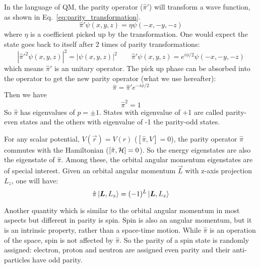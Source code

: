 In the language of QM, the parity operator ($\hat{\pi}'$) will transform 
a wave function, as shown in Eq.~\ref{eq:parity_transformation}.
\begin{equation}
    \hat{\pi}'\psi(x, y, z) = \eta \psi(-x, -y, -z)
    \label{eq:parity_transformation}
\end{equation}
where $\eta$ is a coefficient picked up by the transformation. One would expect
the state goes back to itself after 2 times of parity transformations:
\begin{equation}
    |\hat{\pi}'^2 \psi(x, y, z)|^2 = |\psi(x, y, z)|^2
    \qquad
    \hat{\pi}'\psi(x, y, z) = e^{i\phi/2}\psi(-x, -y, -z)
\end{equation}
which means $\hat{\pi}'$ is an unitary operator. The pick up phase can
be absorbed into the operator to get the new parity operator (what we use hereafter): 
\begin{equation}
    \hat{\pi} = \hat{\pi}'e^{-i\phi/2}
\end{equation}
Then we have
\begin{equation}
    \hat{\pi}^2 = 1 
\end{equation}
So $\hat{\pi}$ has eigenvalues of $p = \pm 1$. States with eigenvalue of +1 are called
parity-even states and the others with eigenvalue of -1 the parity-odd states.

For any scalar potential, $V(\vec{r}) = V(r)$ ($[\hat{\pi}, V] = 0$), the parity 
operator $\hat{\pi}$ commutes with the Hamiltonian ($[\hat{\pi}, \mathcal{H}] = 0$). 
So the energy eigenstates are also the eigenstate
of $\hat{\pi}$. Among these, the orbital angular momentum eigenstates are
of special interest. Given an orbital angular momentum $\vec{L}$ with z-axis projection
$L_z$, one will have:
\begin{equation}
    \hat{\pi}\ket{\boldsymbol{L}, L_z} = (-1)^L\ket{\boldsymbol{L}, L_z}
\end{equation}

Another quantity which is similar to the orbital angular momentum in most aspects but
different in parity is spin. Spin is also an angular momentum, but it is an 
intrinsic property, rather than a space-time motion. While $\hat{\pi}$ is an operation
of the space, spin is not affected by $\hat{\pi}$. So the parity of a spin state
is randomly assigned: electron, proton and neutron are assigned even parity and
their anti-particles have odd parity.


